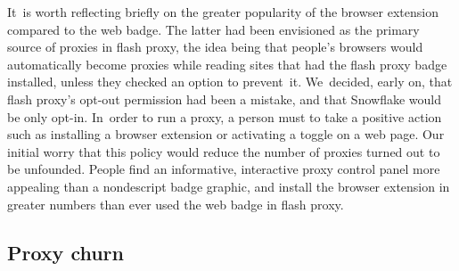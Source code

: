 \documentclass[letterpaper,twocolumn]{article}
\begin{document}
It~is worth reflecting briefly
on the greater popularity of the browser extension
compared to the web badge.
The latter had been envisioned
as the primary source of proxies in flash proxy,
the idea being that people's browsers
would automatically become proxies
while reading sites that had the flash proxy badge installed,
unless they checked an option to prevent~it.
We~decided, early on, that flash proxy's opt-out permission had been a mistake,
%
and that Snowflake would be only opt-in.
In~order to run a proxy, a person must to take a positive action
such as installing a browser extension
or activating a toggle on a web page.
Our initial worry that this policy
would reduce the number of proxies turned out to be unfounded.
People find an informative, interactive proxy control panel more appealing
than a nondescript badge graphic,
and install the browser extension in greater numbers
than ever used the web badge in flash proxy.

\subsection{Proxy churn}
\label{sec:proxy-churn}

\end{document}

